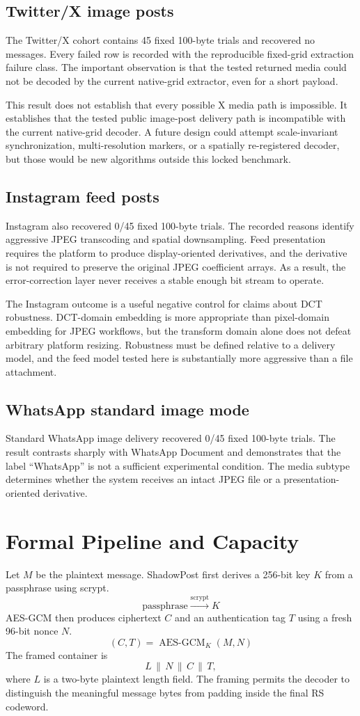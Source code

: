 \documentclass[conference]{IEEEtran}
\newcommand{\safeSection}[1]{\Needspace{5\baselineskip}\section{#1}}
\newcommand{\safeSubsection}[1]{\Needspace{4\baselineskip}\subsection{#1}}
\begin{document}
\safeSubsection{Twitter/X image posts}
The Twitter/X cohort contains 45 fixed 100-byte trials and recovered no messages. Every failed row is recorded with the reproducible fixed-grid extraction failure class. The important observation is that the tested returned media could not be decoded by the current native-grid extractor, even for a short payload.

This result does not establish that every possible X media path is impossible. It establishes that the tested public image-post delivery path is incompatible with the current native-grid decoder. A future design could attempt scale-invariant synchronization, multi-resolution markers, or a spatially re-registered decoder, but those would be new algorithms outside this locked benchmark.

\safeSubsection{Instagram feed posts}
Instagram also recovered 0/45 fixed 100-byte trials. The recorded reasons identify aggressive JPEG transcoding and spatial downsampling. Feed presentation requires the platform to produce display-oriented derivatives, and the derivative is not required to preserve the original JPEG coefficient arrays. As a result, the error-correction layer never receives a stable enough bit stream to operate.

The Instagram outcome is a useful negative control for claims about DCT robustness. DCT-domain embedding is more appropriate than pixel-domain embedding for JPEG workflows, but the transform domain alone does not defeat arbitrary platform resizing. Robustness must be defined relative to a delivery model, and the feed model tested here is substantially more aggressive than a file attachment.

\safeSubsection{WhatsApp standard image mode}
Standard WhatsApp image delivery recovered 0/45 fixed 100-byte trials. The result contrasts sharply with WhatsApp Document and demonstrates that the label ``WhatsApp'' is not a sufficient experimental condition. The media subtype determines whether the system receives an intact JPEG file or a presentation-oriented derivative.

\safeSection{Formal Pipeline and Capacity}
Let $M$ be the plaintext message. ShadowPost first derives a 256-bit key $K$ from a passphrase using scrypt.
\begin{equation}
\text{passphrase}\xrightarrow{\text{scrypt}}K
\end{equation}
AES-GCM then produces ciphertext $C$ and an authentication tag $T$ using a fresh 96-bit nonce $N$.
\begin{equation}
(C,T)=\operatorname{AES\text{-}GCM}_{K}(M,N)
\end{equation}
The framed container is
\begin{equation}
L\,\|\,N\,\|\,C\,\|\,T,
\end{equation}
where $L$ is a two-byte plaintext length field. The framing permits the decoder to distinguish the meaningful message bytes from padding inside the final RS codeword.
\end{document}
